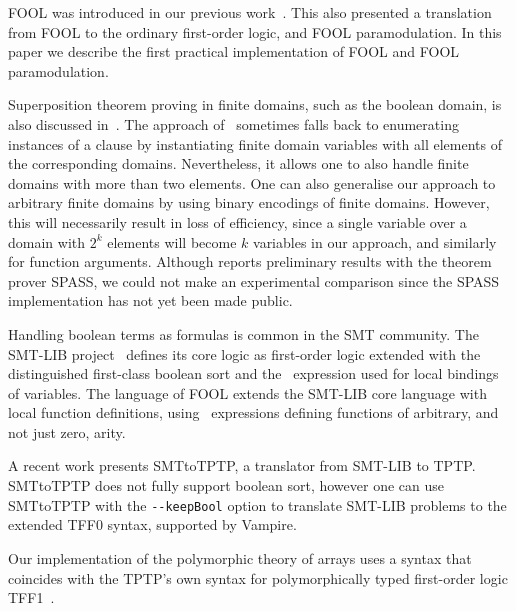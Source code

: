 FOOL was introduced in our previous work~\cite{FOOL}. This also presented a translation from FOOL to the ordinary first-order logic, and FOOL paramodulation. In this paper we describe the first practical implementation of FOOL and FOOL paramodulation.

Superposition theorem proving in finite domains, such as the boolean domain, is also discussed in~\cite{HillenbrandWeidenbach13}. The approach of~\cite{HillenbrandWeidenbach13} sometimes falls back to enumerating instances of a clause by instantiating finite domain variables with all elements of the corresponding domains. Nevertheless, it allows one to also handle finite domains with more than two elements. One can also generalise our approach to arbitrary finite domains by using binary encodings of finite domains. However, this will necessarily result in loss of efficiency, since a single variable over a domain with $2^k$ elements will become $k$ variables in our approach, and similarly for function arguments.
Although \cite{HillenbrandWeidenbach13} reports preliminary results with the theorem prover SPASS, we could not make an experimental comparison since the SPASS implementation has not yet been made public.

Handling boolean terms as formulas is common in the SMT community. The SMT-LIB project~\cite{SMT-LIB} defines its core logic as first-order logic extended with the distinguished first-class boolean sort and the \LETIN\ expression used for local bindings of variables. The language of FOOL extends the SMT-LIB core language with local function definitions, using \LETIN\ expressions defining functions of arbitrary, and not just zero, arity.

A recent work \cite{SMTLIB2TPTP} presents SMTtoTPTP, a translator from SMT-LIB to TPTP. SMTtoTPTP does not fully support boolean sort, however one can use SMTtoTPTP with the \verb'--keepBool' option to translate SMT-LIB problems to the extended TFF0 syntax, supported by Vampire.

Our implementation of the polymorphic theory of arrays uses a syntax that coincides with the TPTP's own syntax for polymorphically typed first-order logic TFF1~\cite{tff1}.
